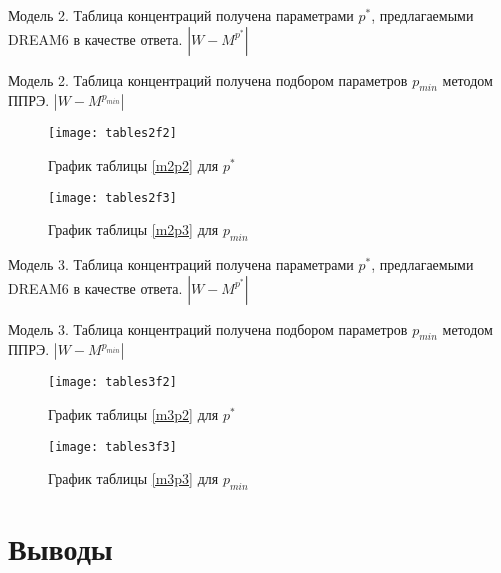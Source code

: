 \begin{table}[h]
  \centering
  
  \caption{Модель 2. Таблица концентраций получена параметрами $p^*$, 
  предлагаемыми DREAM6 в качестве ответа. $|W - M^{p^*}|$}
  \label{m2p2}
\end{table}
\begin{table}[h]
  \centering
  
  \caption{Модель 2. Таблица концентраций получена подбором параметров 
  $p_{min}$ методом ППРЭ. $|W - M^{p_{min}}|$}
  \label{m2p3}
\end{table}
\begin{figure}[h]
  \begin{minipage}[h]{0.5\linewidth}
    \texttt{[image: tables2f2]}
    \caption{График таблицы \ref{m2p2} для $p^*$}
  \end{minipage}
  \hfill
  \begin{minipage}[h]{0.5\linewidth}
    \texttt{[image: tables2f3]}
    \caption{График таблицы \ref{m2p3} для $p_{min}$}
  \end{minipage}
\end{figure}


\begin{table}[h]
  \centering
  
  \caption{Модель 3. Таблица концентраций получена параметрами $p^*$, 
  предлагаемыми DREAM6 в качестве ответа. $|W - M^{p^*}|$}
  \label{m3p2}
\end{table}
\begin{table}[h]
  \centering
  
  \caption{Модель 3. Таблица концентраций получена подбором параметров 
  $p_{min}$ методом ППРЭ. $|W - M^{p_{min}}|$}
  \label{m3p3}
\end{table}
\begin{figure}[h]
  \begin{minipage}[h]{0.5\linewidth}
    \texttt{[image: tables3f2]}
    \caption{График таблицы \ref{m3p2} для $p^*$}
  \end{minipage}
  \hfill
  \begin{minipage}[h]{0.5\linewidth}
    \texttt{[image: tables3f3]}
    \caption{График таблицы \ref{m3p3} для $p_{min}$}
  \end{minipage}
\end{figure}

\clearpage
\section{Выводы} \label{s4}

